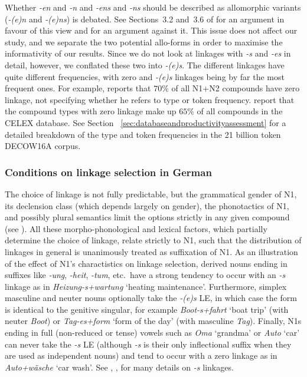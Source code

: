 Whether \textit{-en} and \textit{-n} and \textit{-ens} and \textit{-ns} should be described as allomorphic variants (\ie \textit{-(e)n} and \textit{-(e)ns}) is debated.
See Sections~3.2 and~3.6 of \textcite{NueblingSzczepaniak2013} for an argument in favour of this view and \textcite[33--36]{Neef2015} for an argument against it.
This issue does not affect our study, and we separate the two potential allo-forms in order to maximise the informativity of our results.
Since we do not look at linkages with \textit{-s} and \textit{-es} in detail, however, we conflated these two into \textit{-(e)s}.
The different linkages have quite different frequencies, with zero and \textit{-(e)s} linkages being by far the most frequent ones.
For example, \textcite[177]{Gallmann1998} reports that $70\%$ of all N1+N2 compounds have zero linkage, not specifying whether he refers to type or token frequency.
\textcite[29]{KrottEa2007} report that the compound types with zero linkage make up $65\%$ of all compounds in the CELEX database.
See Section~ \ref{sec:databaseandproductivityassessment} for a detailed breakdown of the type and token frequencies in the 21 billion token DECOW16A corpus.

\subsubsection{Conditions on linkage selection in German}
\label{sec:conditionsonlinkageselectioningerman}

The choice of linkage is not fully predictable, but the grammatical gender of N1, its declension class (which depends largely on gender), the phonotactics of N1, and possibly plural semantics limit the options strictly in any given compound (see \citealt{Fuhrhop1996,NueblingSzczepaniak2013}).
All these morpho-phono\-logical and lexical factors, which partially determine the choice of linkage, relate strictly to N1, such that the distribution of linkages in general is unanimously treated as suffixation of N1.
As an illustration of the effect of N1's charactistics on linkage selection, derived nouns ending in suffixes like \textit{-ung}, \textit{-heit}, \textit{-tum}, etc.\ have a strong tendency to occur with an \textit{-s} linkage as in \textit{Heizung-s+wartung} `heating maintenance'.
Furthermore, simplex masculine and neuter nouns optionally take the \textit{-(e)s} LE, in which case the form is identical to the genitive singular, for example \textit{Boot-s+fahrt} `boat trip' (with neuter \textit{Boot}) or \textit{Tag-es+form} `form of the day' (with masculine \textit{Tag}).
Finally, N1s ending in full (non-reduced or tense) vowels such as \textit{Oma} `grandma' or \textit{Auto} `car' can never take the \textit{-s} LE (although \textit{-s} is their only inflectional suffix when they are used as independent nouns) and tend to occur with a zero linkage as in \textit{Auto+wäsche} `car wash'.
See \textcite{Wegener2003}, \textcite{FuhrhopKuerschner2015}, \textcite{Fehringer2009} for many details on \textit{-s} linkages.

